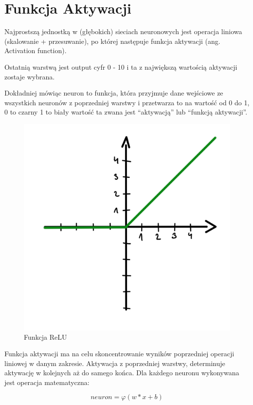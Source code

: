 \documentclass[brudnopis]{xmgr}
\begin{document}
\section{Funkcja Aktywacji  \label{s:dsssl}}

Najprostszą jednostką w (głębokich) sieciach neuronowych jest operacja liniowa (skalowanie + przesuwanie), po której następuje funkcja aktywacji (ang. Activation function).

Ostatnią warstwą jest output cyfr 0 - 10 i ta z największą wartością aktywacji zostaje wybrana. 

Dokładniej mówiąc neuron to funkcja, która przyjmuje dane wejściowe ze wszystkich neuronów z poprzedniej warstwy i przetwarza to na wartość od 0 do 1, 0 to czarny 1 to biały wartość ta zwana jest “aktywacją” lub “funkcją aktywacji”.

\begin{figure}[!tbh]
\centering
\includegraphics[width=.8\hsize]{fig/4}
\caption{Funkcja ReLU\label{RYS.3}}
\end{figure}

Funkcja aktywacji ma na celu skoncentrowanie wyników poprzedniej operacji liniowej w danym zakresie.
Aktywacja z poprzedniej warstwy, determinuje aktywację w kolejnych aż do samego końca. 
Dla każdego neuronu wykonywana jest operacja matematyczna:

\begin{equation}
neuron  = φ (w * x + b)
\end{equation}
\end{document}
